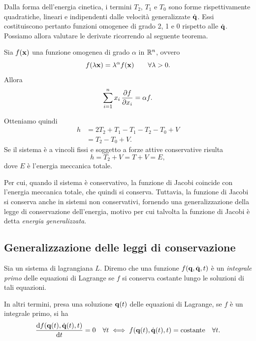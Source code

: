 Dalla forma dell'energia cinetica, i termini $T_2$, $T_1$ e $T_0$ sono forme rispettivamente quadratiche, lineari e indipendenti dalle velocità generalizzate $\dot{\vb{q}}$. Essi costituiscono pertanto funzioni omogenee di grado 2, 1 e 0 rispetto alle $\dot{\vb{q}}$. Possiamo allora valutare le derivate ricorrendo al seguente teorema.
\begin{theorem}
    Sia $f(\vb{x})$ una funzione omogenea di grado $\alpha$ in $\mathbb{R}^n$, ovvero
    \begin{equation*}        
        f(\lambda \vb{x}) = \lambda^\alpha f(\vb{x}) \qquad \forall \lambda > 0.
    \end{equation*}
    Allora
    \begin{equation*}
        \sum_{i=1}^n x_i\,\pdv{f}{x_i} = \alpha f.
    \end{equation*}
\end{theorem}

Otteniamo quindi
\begin{align*}
    h &= 2T_2 +  T_1 - T_1 - T_2 - T_0 + V \\
    &= T_2 - T_0 + V.
\end{align*}
Se il sistema è a vincoli fissi e soggetto a forze attive conservative risulta
\begin{equation*}
    h = T_2 + V = T + V  = E,
\end{equation*}
dove $E$ è l'energia meccanica totale.

Per cui, quando il sistema è conservativo, la funzione di Jacobi coincide con l'energia meccanica totale, che quindi si conserva. Tuttavia, la funzione di Jacobi si conserva anche in sistemi non conservativi, fornendo una generalizzazione della legge di conservazione dell'energia, motivo per cui talvolta la funzione di Jacobi è detta \emph{energia generalizzata}.

\subsection{Generalizzazione delle leggi di conservazione}
\begin{definition}
    Sia un sistema di lagrangiana $L$. Diremo che una funzione $f(\vb{q}, \dot{\vb{q}}, t)$ è un \emph{integrale primo} delle equazioni di Lagrange se $f$ si conserva costante lungo le soluzioni di tali equazioni.
\end{definition}

In altri termini, presa una soluzione $\vb{q}(t)$ delle equazioni di Lagrange, se $f$ è un integrale primo, si ha
\begin{equation*}
    \dv{f(\vb{q}(t), \dot{\vb{q}}(t), t)}{t} = 0 \quad \forall t \iff f(\vb{q}(t), \dot{\vb{q}}(t), t) = \text{costante} \quad \forall t.
\end{equation*}

